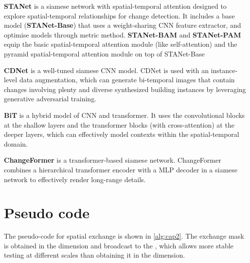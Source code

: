 \documentclass[10pt,twocolumn,letterpaper]{article}
\begin{document}
\textbf{STANet} \cite{chen2020spatial} is a siamese network with spatial-temporal attention designed to explore spatial-temporal relationships for change detection. It includes a base model (\textbf{STANet-Base}) that uses a weight-sharing CNN feature extractor, and optimise models through metric method. \textbf{STANet-BAM} and \textbf{STANet-PAM} equip the basic spatial-temporal attention module (like self-attention) and the pyramid spatial-temporal attention module on top of STANet-Base

\textbf{CDNet} \cite{chen2021adversarial} is a well-tuned siamese CNN model. CDNet is used with an instance-level data augmentation, which can generate bi-temporal images that contain changes involving plenty and diverse synthesized building instances by leveraging generative adversarial training.

\textbf{BiT} \cite{chen2021efficient} is a hybrid model of CNN and transformer. It uses the convolutional blocks at the shallow layers and the transformer blocks (with cross-attention) at the deeper layers, which can effectively model contexts within the spatial-temporal domain.

\textbf{ChangeFormer} \cite{chen2021efficient} is a transformer-based siamese network. ChangeFormer combines a hierarchical transformer encoder with a MLP decoder in a siamese network to effectively render long-range details.

\section{Pseudo code}
The pseudo-code for spatial exchange is shown in \cref{alg:cap2}. The exchange mask is obtained in the  dimension and broadcast to the , which allows more stable testing at different scales than obtaining it in the  dimension.
\end{document}
